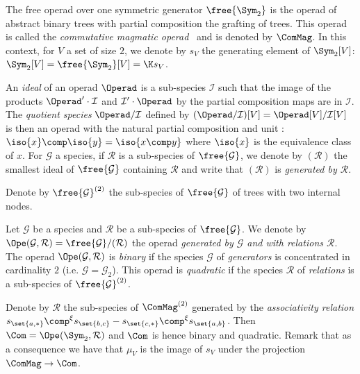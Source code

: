\begin{exam}[$\ComMag$]
    The free operad over one symmetric generator $\free{\Sym_2}$ is the operad of abstract binary trees
    with partial composition the grafting of trees. This operad is called the {\em commutative magmatic 
    operad}~\cite{BL11} and is denoted by $\ComMag$. In this context, for $V$ a set of size $2$, we denote 
    by $s_V$ the generating element of $\Sym_2[V]$: $\Sym_2[V]=\free{\Sym_2}[V] = \K s_V$.
\end{exam}

An {\em ideal} of an operad $\Operad$ is a sub-species $\mathcal{I}$ such that the image of the products
$\Operad'\cdot \mathcal{I}$ and $\mathcal{I}'\cdot\Operad$ by the partial composition maps are in 
$\mathcal{I}$. The {\em quotient species} $\Operad/ \mathcal{I}$ defined by 
$(\Operad/\mathcal{I})[V] = \Operad[V]/\mathcal{I}[V]$ is then an operad with the natural partial 
composition and unit : $\iso{x}\comp\iso{y}=\iso{x\comp y}$ where $\iso{x}$ is the equivalence class of 
$x$. For $\mathcal{G}$ a species, if $\mathcal{R}$ is a sub-species of $\free{\mathcal{G}}$, we denote 
by $(\mathcal{R})$ the smallest ideal of $\free{\mathcal{G}}$ containing $\mathcal{R}$ and write that 
$(\mathcal{R})$ is {\em generated by $\mathcal{R}$}.

Denote by $\free{\mathcal{G}}^{(2)}$ the sub-species of $\free{\mathcal{G}}$ of trees with two internal nodes.

\begin{defi}
    Let $\mathcal{G}$ be a species and $\mathcal{R}$ be a sub-species of $\free{\mathcal{G}}$. We denote by 
    $\Ope(\mathcal{G},\mathcal{R})=\free{\mathcal{G}}/(\mathcal{R})$ the operad {\em generated by 
    $\mathcal{G}$ and with relations $\mathcal{R}$}. 
    The operad $\Ope(\mathcal{G},\mathcal{R})$ is {\em binary} if the species $\mathcal{G}$ of 
    {\em generators} is concentrated in cardinality $2$ (i.e. $\mathcal{G} = \mathcal{G}_2$). This operad 
    is {\em quadratic} if the species $\mathcal{R}$ of {\em relations} is a sub-species of 
    $\free{\mathcal{G}}^{(2)}$.
\end{defi}

\begin{exam}\label{ex_gen_com} 
    Denote by $\mathcal{R}$ the sub-species of $\ComMag^{(2)}$ generated by the {\em associativity relation}
    $s_{\set{a,\ast}}\comp^{\xi} s_{\set{b,c}} - s_{\set{c,\ast}}\comp^{\xi} s_{\set{a,b}}$. 
    Then $\Com=\Ope(\Sym_2,\mathcal{R})$ and $\Com$ is hence binary and quadratic. Remark that as a 
    consequence we have that $\mu_V$ is the image of $s_V$ under the projection $\ComMag\to\Com$.
\end{exam}

